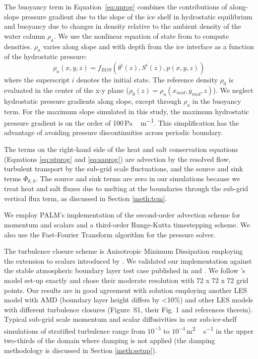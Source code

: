 \documentclass[tc, manuscript]{copernicus}
\begin{document}
The buoyancy term in Equation~\ref{eq:uprog} combines the contributions of along-slope pressure gradient due to the slope of the ice shelf in hydrostatic equilibrium and buoyancy due to changes in density relative to the ambient density of the water column $\rho_a$. We use the nonlinear equation of state from \citet{jackett_algorithms_2006} to compute densities. $\rho_a$ varies along slope and with depth from the ice interface as a function of the hydrostatic pressure: 
\begin{equation}
    \rho_a(x,y,z) = f_{EOS}\left(\theta^i(z),S^i(z),p(x,y,z)\right)
\end{equation}
where the superscript $i$ denotes the initial state. The reference density $\rho_0$ is evaluated in the center of the x-y plane ($\rho_0(z) = \rho_a(x_{mid},y_{mid},z)$). We neglect hydrostatic pressure gradients along slope, except through $\rho_a$ in the buoyancy term. For the maximum slope simulated in this study, the maximum hydrostatic pressure gradient is on the order of 100\,\unit{Pa\,m^{-1}}. This simplification has the advantage of avoiding pressure discontinuities across periodic boundary. 

The terms on the right-hand side of the heat and salt conservation equations (Equations \ref{eq:ptprog} and \ref{eq:saprog}) are advection by the resolved flow, turbulent transport by the sub-grid scale fluctuations, and the source and sink terms  $\Phi_{\theta,S}$. The source and sink terms are zero in our simulations because we treat heat and salt fluxes due to melting at the boundaries through the sub-grid vertical flux term, as discussed in Section \ref{meth:tcm}. 

We employ PALM's implementation of the \citet{piacsek_conservation_1970} second-order advection scheme for momentum and scalars and a third-order Runge-Kutta timestepping scheme. We also use the \citet{temperton_generalized_1992} Fast-Fourier Transform algorithm for the pressure solver. 

The turbulence closure scheme is Anisotropic Minimum Dissipation \cite[AMD;][]{rozema_minimum-dissipation_2015} employing the extension to scalars introduced by \citet{abkar_minimum-dissipation_2016}. We validated our implementation against the stable atmospheric boundary layer test case published in \citet{abkar_large-eddy_2017} and \citet{stoll_large-eddy_2008}. We follow \citet[]['s]{abkar_large-eddy_2017}'s model set-up exactly and chose their moderate resolution with 72 x 72 x 72 grid points. Our results are in good agreement with \citet[]['s]{abkar_large-eddy_2017} solution employing another LES model with AMD (boundary layer height differs by <10\%) and other LES models with different turbulence closures (Figure~S1, their Fig. 1 and references therein). Typical sub-grid scale momentum and scalar diffusivities in our sub-ice-shelf simulations of stratified turbulence range from $10^{-5}$ to $10^{-4}$\,\unit{m^2\,s^{-1}} in the upper two-thirds of the domain where damping is not applied (the damping methodology is discussed in Section \ref{meth:setup}). 
\end{document}
